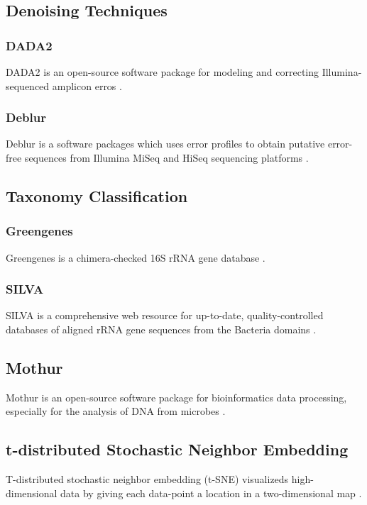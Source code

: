 \documentclass[11pt, a4paper]{article}
\begin{document}
        \subsection{Denoising Techniques}
            \subsubsection{DADA2}
                DADA2 is an open-source software package for modeling and correcting Illumina-sequenced amplicon erros \cite{DADA2}.

            \subsubsection{Deblur}
                Deblur is a software packages which uses error profiles to obtain putative error-free sequences from Illumina MiSeq and HiSeq sequencing platforms \cite{Deblur1}.

        \subsection{Taxonomy Classification}
            \subsubsection{Greengenes}
                Greengenes is a chimera-checked 16S rRNA gene database \cite{greengenes1}.

            \subsubsection{SILVA}
                SILVA is a comprehensive web resource for up-to-date, quality-controlled databases of aligned rRNA gene sequences from the Bacteria domains \cite{silva1, silva2}.

        \subsection{Mothur}
            Mothur is an open-source software package for bioinformatics data processing, especially for the analysis of DNA from microbes \cite{mothur1}.

        \subsection[t-SNE]{t-distributed Stochastic Neighbor Embedding}
            T-distributed stochastic neighbor embedding (t-SNE) visualizeds high-dimensional data by giving each data-point a location in a two-dimensional map \cite{tsne1}.
\end{document}
